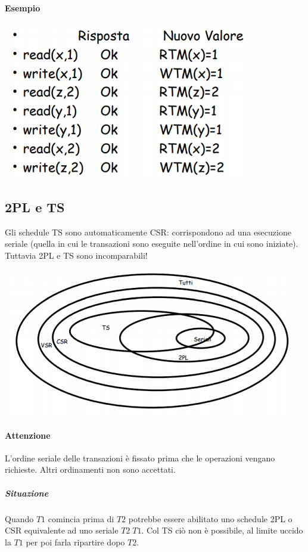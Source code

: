\paragraph{Esempio} 
\begin{center}\includegraphics{images/170.PNG}\end{center}
\pagebreak


\subsection{2PL e TS} Gli schedule TS sono automaticamente CSR: corrispondono ad una esecuzione seriale (quella in cui le transazioni sono eseguite nell'ordine in cui sono iniziate). Tuttavia 2PL e TS sono incomparabili!
\begin{center}\includegraphics{images/171.PNG}\end{center}
\paragraph{Attenzione} L'ordine seriale delle transazioni è fissato prima che le operazioni vengano richieste. Altri ordinamenti non sono accettati.
\subparagraph{Situazione} Quando $T1$ comincia prima di $T2$ potrebbe essere abilitato uno schedule 2PL o CSR equivalente ad uno seriale $T2\;T1$. Col TS ciò non è possibile, al limite uccido la $T1$ per poi farla ripartire dopo $T2$.
